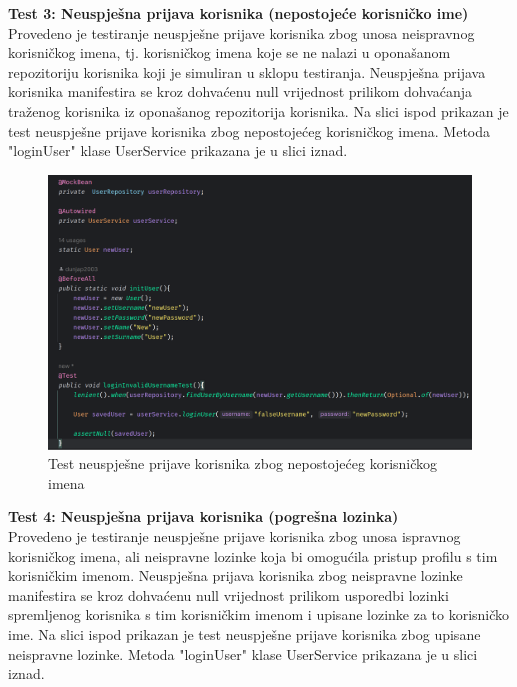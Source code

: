 \textbf{Test 3: Neuspješna prijava korisnika (nepostojeće korisničko ime)} \\
Provedeno je testiranje neuspješne prijave korisnika zbog unosa neispravnog korisničkog imena, tj. korisničkog imena koje se ne nalazi u oponašanom repozitoriju korisnika koji je simuliran u sklopu testiranja. Neuspješna prijava korisnika manifestira se kroz dohvaćenu null vrijednost prilikom dohvaćanja traženog korisnika iz oponašanog repozitorija korisnika. Na slici ispod prikazan je test neuspješne prijave korisnika zbog nepostojećeg korisničkog imena. Metoda "loginUser" klase UserService prikazana je u slici iznad.

				\begin{figure}[H]
			\includegraphics[scale=0.4]{slike/loginInvalidUsernameTest.PNG} %
			\centering
			\caption{Test neuspješne prijave korisnika zbog nepostojećeg korisničkog imena}
			\label{Test neuspješne prijave korisnika zbog nepostojećeg korisničkog imena}
		\end{figure}
		
\textbf{Test 4: Neuspješna prijava korisnika (pogrešna lozinka)} \\
Provedeno je testiranje neuspješne prijave korisnika zbog unosa ispravnog korisničkog imena, ali neispravne lozinke koja bi omogućila pristup profilu s tim korisničkim imenom. Neuspješna prijava korisnika zbog neispravne lozinke manifestira se kroz dohvaćenu null vrijednost prilikom usporedbi lozinki spremljenog korisnika s tim korisničkim imenom i upisane lozinke za to korisničko ime. Na slici ispod prikazan je test neuspješne prijave korisnika zbog upisane neispravne lozinke. Metoda "loginUser" klase UserService prikazana je u slici iznad.


